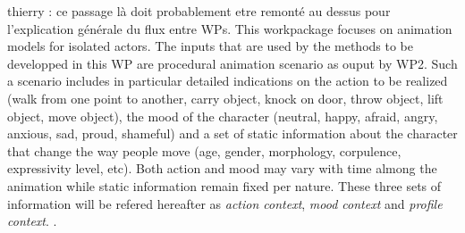 
thierry : ce passage là doit probablement etre remonté au dessus pour l'explication générale du flux entre WPs. This workpackage focuses on animation models for isolated actors. 
The inputs that are used by the methods to be developped in this WP are procedural animation scenario as ouput by WP2. 
Such a scenario includes in particular detailed indications on the action to be realized (walk from one point to another, carry object, knock on door, throw object, lift object, move object), the mood of the character (neutral, happy, afraid, angry, anxious, sad, proud, shameful) and a set of static information about the character that change the way people move (age, gender, morphology, corpulence, expressivity level, etc). Both action and mood may vary with time almong the animation while static information remain fixed per nature. 
These three sets of information will be refered hereafter as \textit{action context}, \textit{mood context} and \textit{profile context}. . 
% 
% 
% 
